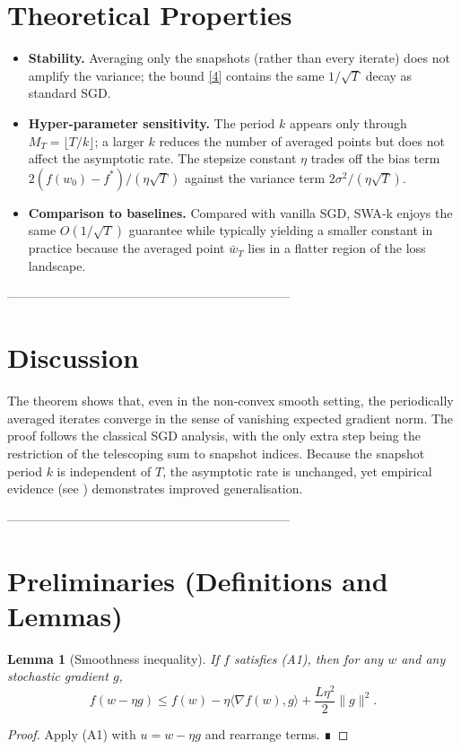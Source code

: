 \documentclass{article}
\newtheorem{lemma}{Lemma}
\begin{document}
\section*{Theoretical Properties}
\begin{itemize}
\item \textbf{Stability.} Averaging only the snapshots (rather than every iterate)
does not amplify the variance; the bound \eqref{4} contains the same $1/\sqrt{T}$
decay as standard SGD.
\item \textbf{Hyper‑parameter sensitivity.}
The period $k$ appears only through $M_T=\lfloor T/k\rfloor$; a larger $k$
reduces the number of averaged points but does not affect the asymptotic rate.
The stepsize constant $\eta$ trades off the bias term
$2(f(w_0)-f^{*})/(\eta\sqrt{T})$ against the variance term $2\sigma^{2}/(\eta\sqrt{T})$.
\item \textbf{Comparison to baselines.}
Compared with vanilla SGD, SWA‑k enjoys the same $O(1/\sqrt{T})$ guarantee
while typically yielding a smaller constant in practice because the
averaged point $\bar w_T$ lies in a flatter region of the loss landscape.
\end{itemize}

--------------------------------------------------------------------

\section*{Discussion}
The theorem shows that, even in the non‑convex smooth setting, the
periodically averaged iterates converge in the sense of vanishing expected
gradient norm.  The proof follows the classical SGD analysis, with
the only extra step being the restriction of the telescoping sum to
snapshot indices.  Because the snapshot period $k$ is independent of $T$,
the asymptotic rate is unchanged, yet empirical evidence (see
\cite{izmailov2018averaging}) demonstrates improved generalisation.

--------------------------------------------------------------------

\section*{Preliminaries (Definitions and Lemmas)}
\begin{lemma}[Smoothness inequality]\label{lem:smooth}
If $f$ satisfies (A1), then for any $w$ and any stochastic gradient $g$,
\[
f(w-\eta g)\le f(w)-\eta\langle\nabla f(w),g\rangle
+\frac{L\eta^{2}}{2}\|g\|^{2}. \tag{5}
\]
\end{lemma}
\begin{proof}
Apply (A1) with $u=w-\eta g$ and rearrange terms.  ∎
\end{proof}
\end{document}
